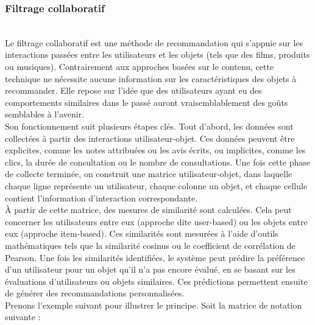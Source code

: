 \documentclass{article}
\begin{document}
\subsubsection{Filtrage collaboratif}
$ $\\
Le filtrage collaboratif est une méthode de recommandation qui s'appuie sur les interactions passées entre les utilisateurs et les objets 
(tels que des films, produits ou musiques). Contrairement aux approches basées sur le contenu, cette technique ne nécessite aucune information 
sur les caractéristiques des objets à recommander. Elle repose sur l’idée que des utilisateurs ayant eu des comportements similaires dans le 
passé auront vraisemblablement des goûts semblables à l’avenir.
$ $\\
Son fonctionnement suit plusieurs étapes clés. Tout d’abord, les données sont collectées à partir des interactions utilisateur-objet. 
Ces données peuvent être explicites, comme les notes attribuées ou les avis écrits, ou implicites, comme les clics, la durée de 
consultation ou le nombre de consultations. Une fois cette phase de collecte terminée, on construit une matrice utilisateur-objet, 
dans laquelle chaque ligne représente un utilisateur, chaque colonne un objet, et chaque cellule contient l’information d’interaction 
correspondante.
$ $\\
À partir de cette matrice, des mesures de similarité sont calculées. Cela peut concerner les utilisateurs entre eux 
(approche dite user-based) ou les objets entre eux (approche item-based). Ces similarités sont mesurées à l’aide d’outils 
mathématiques tels que la similarité cosinus ou le coefficient de corrélation de Pearson. Une fois les similarités identifiées, 
le système peut prédire la préférence d’un utilisateur pour un objet qu’il n’a pas encore évalué, en se basant sur les évaluations 
d’utilisateurs ou objets similaires. Ces prédictions permettent ensuite de générer des recommandations personnalisées.
$ $\\
Prenons l’exemple suivant pour illustrer le principe. Soit la matrice de notation suivante :
\end{document}
